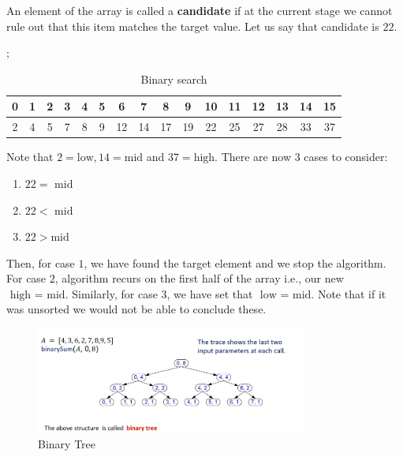 \documentclass[a4paper]{article}
\theoremstyle{plain}
\theoremstyle{definition}
\newtheorem{exmp}{Example}[section]
\theoremstyle{remark}
\begin{document}
\begin{tcolorbox}[colback=black!3!white,colframe=black!60!white,title=\begin{exmp}Find 22 \label{Find 22}\end{exmp}]
        An element of the array is called a \textbf{candidate} if at the current stage we cannot rule out that this item matches the target value. Let us say that candidate is $22$.
\begin{table}[H]
	\centering
	\caption{Binary search};
	\label{tab:binarysearch}
	\begin{tabular}{|c|c|c|c|c|c|c|c|c|c|c|c|c|c|c|c|} \hline
		0 & 1 &2  &3  &4  &5  &6  &7& 8 &9  &10  & 11 & 12 & 13 & 14 & 15 \\
		\hline
		2 & 4 & 5 & 7 & 8 & 9 & 12 & 14 & 17 & 19 & 22 & 25 &27 & 28& 33 & 37\\ \hline
	\end{tabular}
\end{table}
Note that $2 = \text{low}, 14 =   \text{mid}$ and $37 = \text{high}$. There are now $3$ cases to consider:
\begin{enumerate}
	\item $22 = \text{ mid}$ 
	\item $22 < \text{ mid}$ 
	\item $22 > \text{mid}$
\end{enumerate}
	Then, for case $1$, we have found the target element and we stop the algorithm. For case $2$, algorithm recurs on the first half of the array i.e., our new $\text{ high = mid}$. Similarly, for case $3$, we have set that $\text{ low = mid}$. Note that if it was unsorted we would not be able to conclude these.
	\begin{figure}[H]
		\centering
		\includegraphics[width=0.8\textwidth]{figures/tree.png}
		\caption{Binary Tree}
		\label{fig:figures-tree-png}
	\end{figure}
\end{tcolorbox}
\end{document}
